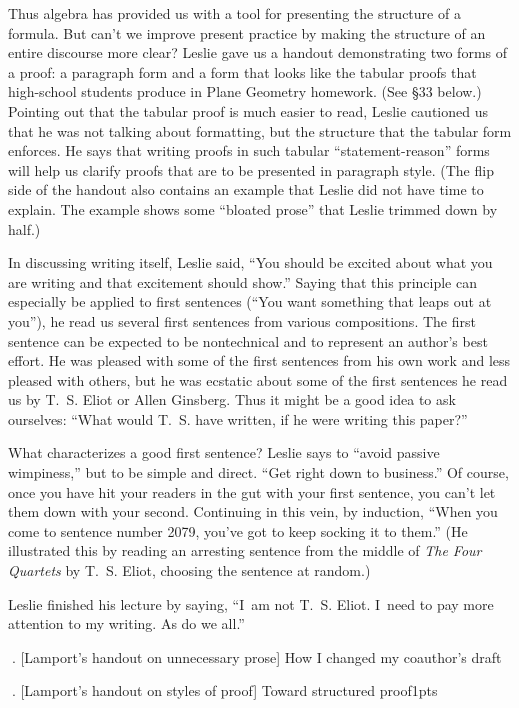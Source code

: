 Thus algebra has provided us with a tool for presenting the structure
of a formula. But can't we improve present practice by making the
structure of an entire discourse more clear?
Leslie gave us a handout demonstrating two forms of a proof: a paragraph
form and a form that looks like the tabular proofs that high-school
students  produce in Plane
Geometry homework. (See \S{33} below.)
Pointing out that the tabular proof is much easier to read,
Leslie cautioned us that he was not talking about formatting, but the
structure that the tabular form enforces.  He says that writing proofs in
such tabular ``statement-reason'' forms will help us clarify proofs that are
to be presented in paragraph style. (The flip side of the
handout also contains an example
that Leslie did not have time to explain.  The example shows some
``bloated prose'' that Leslie trimmed down by half.)

In discussing writing itself, Leslie said, ``You should be excited about
what you are writing and that excitement should show.''  Saying that this
principle can especially be applied to first sentences (``You want
something that leaps out at you''), he read us several first sentences from
various compositions.  
The first sentence can be expected to be nontechnical and to represent
an author's best effort.
He was pleased with some of the first sentences
from his own work and less pleased with others, but he was ecstatic about
some of the first sentences he read us by T.~S. Eliot or Allen Ginsberg.
Thus it might be a good idea to ask ourselves: ``What would T.~S.
have written, if he were writing this paper?''

What characterizes a good first sentence?  Leslie says to ``avoid  passive
wimpiness,'' but to be simple and direct.  ``Get right down to
business.''  Of course, once you have hit your readers in the gut with your
first sentence, you can't let them down with your second. Continuing in
this vein, by induction, ``When you come to sentence number 2079, you've
got to keep socking it to them.''  (He illustrated this by reading an
arresting sentence from the middle of {\sl The Four Quartets\/} by T.~S. Eliot,
choosing the sentence at random.)

Leslie finished his lecture by saying, ``I~am not T.~S. Eliot.  I~need to
pay more attention to my writing.  As do we all.''

. [Lamport's handout on unnecessary prose] How I changed
my coauthor's draft

\vfill\eject
. [Lamport's handout on styles of proof] Toward structured proof\kern1pts

